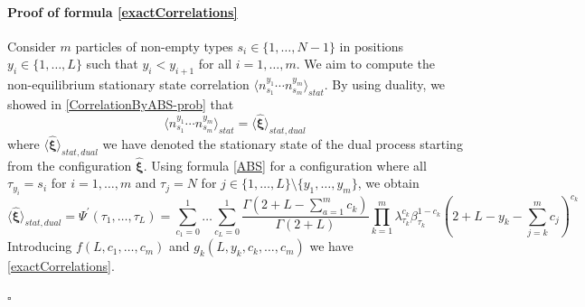 \documentclass[10pt]{article}
\numberwithin{equation}{section}
\numberwithin{equation}{subsection}
\begin{document}
\paragraph{Proof of formula \eqref{exactCorrelations}} Consider $m$ particles of non-empty types $s_{i}\in\{1,\ldots,N-1\}$ in positions $y_{i}\in\{1,\ldots,L\}$ such that $y_{i}<y_{i+1}$ for all $i=1,\ldots,m$. We aim to compute the non-equilibrium stationary state correlation $\langle n_{s_{1}}^{y_{1}}\cdots n_{s_{m}}^{y_{m}} \rangle_{stat}$. By using duality, we showed in \eqref{CorrelationByABS-prob} that
 \begin{equation}
 	\langle n_{s_{1}}^{y_{1}}\cdots n_{s_{m}}^{y_{m}} \rangle_{stat}=\langle\hat{\bm{\xi}}\rangle_{stat,dual}
 \end{equation} 
where $\langle\hat{\bm{\xi}}\rangle_{stat,dual}$ we have denoted the stationary state of the dual process starting from the configuration $\hat{\bm{\xi}}$. 
Using formula \eqref{ABS} for a configuration where all $\tau_{y_{i}}=s_{i}$  for $i=1,\ldots,m$ and $\tau_{j}=N$ for $j\in\{1,\ldots,L\}\setminus \{y_{1},\ldots,y_{m}\}$, we obtain 
\begin{equation}
 \langle\hat{\bm{\xi}}\rangle_{stat,dual}=\Psi^{'}(\tau_{1},\ldots,\tau_{L})=\sum_{c_{1}=0}^{1}\ldots\sum_{c_{L}=0}^{1}\frac{\Gamma(2+L-\sum_{a=1}^{m}c_{k})}{\Gamma(2+L)}\prod_{k=1}^{m}\lambda_{\tau_{k}}^{c_{k}}\beta_{\tau_{k}}^{1-c_{k}}\left(2+L-y_{k}-\sum_{j=k}^{m}c_{j}\right)^{c_{k}}
\end{equation}
Introducing $f(L,c_{1},\ldots,c_{m})$ and $g_{k}(L,y_{k},c_{k},\ldots,c_{m})$ we have \eqref{exactCorrelations}.
\begin{flushright}
	$\square$
\end{flushright}
\end{document}
